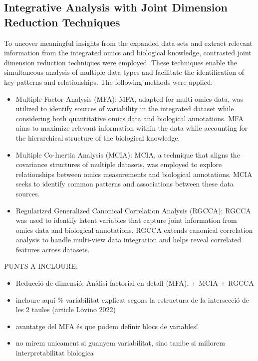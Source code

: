 \documentclass[a4paper, nobind]{templates/ociamthesis}
\begin{document}
\hypertarget{integrative-analysis-with-joint-dimension-reduction-techniques}{%
\subsection{Integrative Analysis with Joint Dimension Reduction Techniques}\label{integrative-analysis-with-joint-dimension-reduction-techniques}}

To uncover meaningful insights from the expanded data sets and extract relevant information from the integrated omics and biological knowledge, contrasted joint dimension reduction techniques were employed. These techniques enable the simultaneous analysis of multiple data types and facilitate the identification of key patterns and relationships. The following methods were applied:

\begin{itemize}
\item
  Multiple Factor Analysis (MFA): MFA, adapted for multi-omics data, was utilized to identify sources of variability in the integrated dataset while considering both quantitative omics data and biological annotations. MFA aims to maximize relevant information within the data while accounting for the hierarchical structure of the biological knowledge.
\item
  Multiple Co-Inertia Analysis (MCIA): MCIA, a technique that aligns the covariance structures of multiple datasets, was employed to explore relationships between omics measurements and biological annotations. MCIA seeks to identify common patterns and associations between these data sources.
\item
  Regularized Generalized Canonical Correlation Analysis (RGCCA): RGCCA was used to identify latent variables that capture joint information from omics data and biological annotations. RGCCA extends canonical correlation analysis to handle multi-view data integration and helps reveal correlated features across datasets.
\end{itemize}

PUNTS A INCLOURE:

\begin{itemize}
\item
  Reducció de dimensió. Anàlisi factorial en detall (MFA), + MCIA + RGCCA
\item
  incloure aquí \% variabilitat explicat segons la estructura de la intersecció de les 2 taules (article Lovino 2022)
\item
  avantatge del MFA és que podem definir blocs de variables!
\item
  no mirem unicament si guanyem variabilitat, sino tambe si millorem interpretabilitat biologica
\end{itemize}
\end{document}
